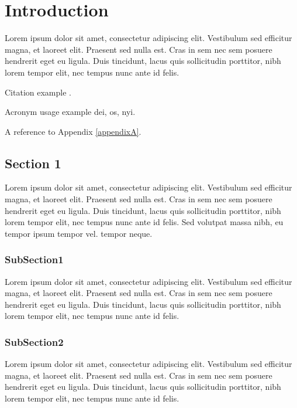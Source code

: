 \chapter{Introduction}
\label{sec:introduction}

Lorem ipsum dolor sit amet, consectetur adipiscing elit. Vestibulum sed efficitur magna, et laoreet elit. Praesent sed nulla est. Cras in sem nec sem posuere hendrerit eget eu ligula. Duis tincidunt, lacus quis sollicitudin porttitor, nibh lorem tempor elit, nec tempus nunc ante id felis.

Citation example \cite{oppenheimer_why_2003}. 

Acronym usage example \gls{dei}, \gls{os}, \gls{nyi}.


A reference to Appendix \ref{appendixA}.

\section{Section 1}
\label{subsec:sec1}

Lorem ipsum dolor sit amet, consectetur adipiscing elit. Vestibulum sed efficitur magna, et laoreet elit. Praesent sed nulla est. Cras in sem nec sem posuere hendrerit eget eu ligula. Duis tincidunt, lacus quis sollicitudin porttitor, nibh lorem tempor elit, nec tempus nunc ante id felis. Sed volutpat massa nibh, eu tempor ipsum tempor vel. tempor neque.


\subsection{SubSection1}

Lorem ipsum dolor sit amet, consectetur adipiscing elit. Vestibulum sed efficitur magna, et laoreet elit. Praesent sed nulla est. Cras in sem nec sem posuere hendrerit eget eu ligula. Duis tincidunt, lacus quis sollicitudin porttitor, nibh lorem tempor elit, nec tempus nunc ante id felis.

\subsection{SubSection2}

Lorem ipsum dolor sit amet, consectetur adipiscing elit. Vestibulum sed efficitur magna, et laoreet elit. Praesent sed nulla est. Cras in sem nec sem posuere hendrerit eget eu ligula. Duis tincidunt, lacus quis sollicitudin porttitor, nibh lorem tempor elit, nec tempus nunc ante id felis.

